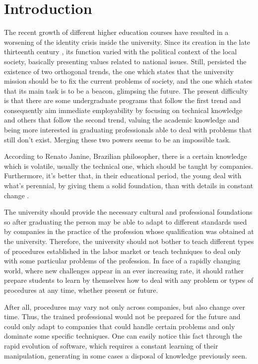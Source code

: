 \documentclass[conference]{IEEEtran}
\begin{document}
\section{Introduction}
	The recent growth of different higher education courses have resulted in a worsening of the identity crisis inside the university. Since its creation in the late thirteenth century \cite{oliveira:origem_universidades}, its function varied with the political context of the local society, basically presenting values related to national issues. Still, persisted the existence of two orthogonal trends, the one which states that the university mission should be to fix the current problems of society, and the one which states that its main task is to be a beacon, glimpsing the future. The present difficulty is that there are some undergraduate programs that follow the first trend and consequently aim immediate employability by focusing on technical knowledge and others that follow the second trend, valuing the academic knowledge and being more interested in graduating professionals able to deal with problems that still don't exist. Merging these two powers seems to be an impossible task.
	
	According to Renato Janine, Brazilian philosopher, there is a certain knowledge which is volatile, usually the technical one, which should be taught by companies. Furthermore, it's better that, in their educational period, the young deal with what's perennial, by giving them a solid foundation, than with details in constant change \cite{ribeiro:universidade_vida_atual}.

	The university should provide the necessary cultural and professional foundations so after graduating the person may be able to adapt to different standards used by companies in the practice of the profession whose qualification was obtained at the university. Therefore, the university should not bother to teach different types of procedures established in the labor market or teach techniques to deal only with some particular problems of the profession. In face of a rapidly changing world, where new challenges appear in an ever increasing rate, it should rather prepare students to learn by themselves how to deal with any problem or types of procedures at any time, whether present or future.

	After all, procedures may vary not only across companies, but also change over time. Thus, the trained professional would not be prepared for the future and could only adapt to companies that could handle certain problems and only dominate some specific techniques. One can easily notice this fact through the rapid evolution of software, which requires a constant learning of their manipulation, generating in some cases a disposal of knowledge previously seen.
\end{document}

